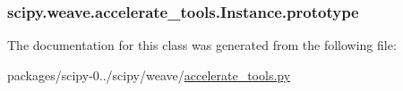 \subsubsection[{prototype}]{\setlength{\rightskip}{0pt plus 5cm}scipy.\+weave.\+accelerate\+\_\+tools.\+Instance.\+prototype}\label{classscipy_1_1weave_1_1accelerate__tools_1_1Instance_ad2c9ec3f052a52c4da92bc6eee0577f9}


The documentation for this class was generated from the following file\+:\begin{DoxyCompactItemize}
\item 
packages/scipy-\/0../scipy/weave/\hyperlink{accelerate__tools_8py}{accelerate\+\_\+tools.\+py}\end{DoxyCompactItemize}
